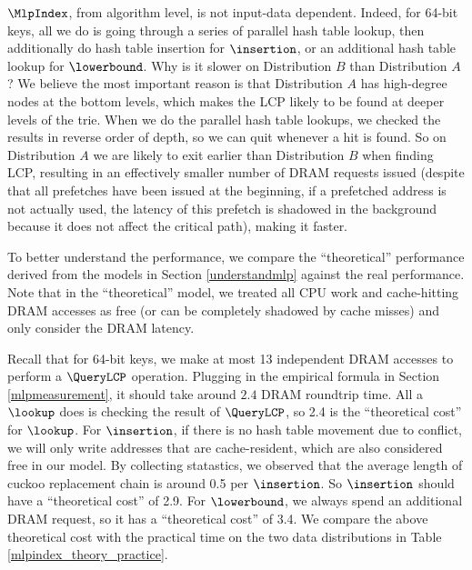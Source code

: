 \documentclass[11pt, usletter]{article}
\begin{document}
$\MlpIndex$, from algorithm level, is not input-data dependent. 
Indeed, for 64-bit keys, all we do is going through a series of parallel hash table lookup, 
then additionally do hash table insertion for $\insertion$, or an additional hash table lookup for $\lowerbound$. 
Why is it slower on Distribution $B$ than Distribution $A$? 
We believe the most important reason is that Distribution $A$ has high-degree nodes at the bottom levels, 
which makes the LCP likely to be found at deeper levels of the trie. 
When we do the parallel hash table lookups, we checked the results in reverse order of depth, 
so we can quit whenever a hit is found. 
So on Distribution $A$ we are likely to exit earlier than Distribution $B$ when finding LCP, 
resulting in an effectively smaller number of DRAM requests issued 
(despite that all prefetches have been issued at the beginning, if a prefetched address is not actually used, 
the latency of this prefetch is shadowed in the background because it does not affect the critical path), 
making it faster.

To better understand the performance, 
we compare the ``theoretical'' performance derived from the models in Section \ref{understandmlp} against the real performance. 
Note that in the ``theoretical'' model, 
we treated all CPU work and cache-hitting DRAM accesses as free (or can be completely shadowed by cache misses) 
and only consider the DRAM latency.

Recall that for 64-bit keys, we make at most 13 independent DRAM accesses to perform a $\QueryLCP$ operation. 
Plugging in the empirical formula in Section \ref{mlpmeasurement}, it should take around $2.4$ DRAM roundtrip time.
All a $\lookup$ does is checking the result of $\QueryLCP$, so 2.4 is the ``theoretical cost'' for $\lookup$. 
For $\insertion$, if there is no hash table movement due to conflict, we will only write addresses that are cache-resident, 
which are also considered free in our model. 
By collecting statastics, we observed that the average length of cuckoo replacement chain is around 0.5 per $\insertion$. 
So $\insertion$ should have a ``theoretical cost'' of 2.9.
For $\lowerbound$, we always spend an additional DRAM request, 
so it has a ``theoretical cost'' of 3.4. We compare the above theoretical cost with the practical time 
on the two data distributions in Table \ref{mlpindex_theory_practice}.
\end{document}
